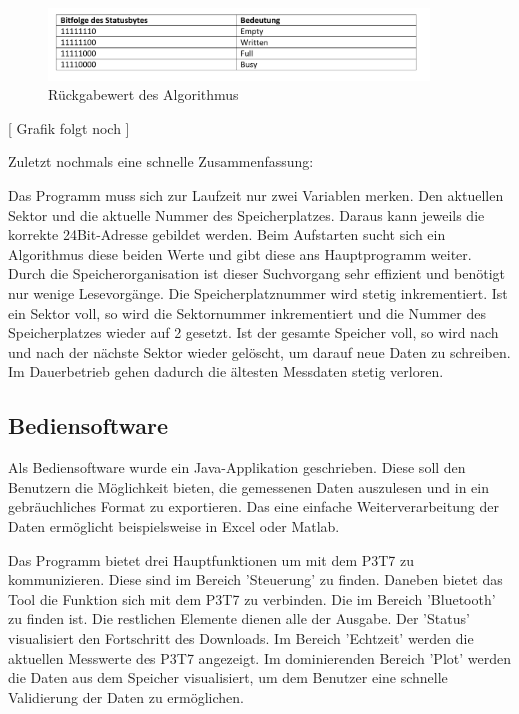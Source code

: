\begin{figure}[H]
\begin{center}
\includegraphics[width=0.9\textwidth]{images/Software_Tabelle_4.png}
\caption{Rückgabewert des Algorithmus}
\label{fig:Rückgabewert}
\end{center}
\end{figure}

[ Grafik folgt noch ] 

Zuletzt nochmals eine schnelle Zusammenfassung:

Das Programm muss sich zur Laufzeit nur zwei Variablen merken. Den aktuellen Sektor und die aktuelle Nummer des Speicherplatzes. Daraus kann jeweils die korrekte 24Bit-Adresse gebildet werden. Beim Aufstarten sucht sich ein Algorithmus diese beiden Werte und gibt diese ans Hauptprogramm weiter. Durch die Speicherorganisation ist dieser Suchvorgang sehr effizient und benötigt nur wenige Lesevorgänge. Die Speicherplatznummer wird stetig inkrementiert. Ist ein Sektor voll, so wird die Sektornummer inkrementiert und die Nummer des Speicherplatzes wieder auf 2 gesetzt. Ist der gesamte Speicher voll, so wird nach und nach der nächste Sektor wieder gelöscht, um darauf neue Daten zu schreiben. Im Dauerbetrieb gehen dadurch die ältesten Messdaten stetig verloren. 


\pagebreak
\subsection{Bediensoftware}%
Als Bediensoftware wurde ein Java-Applikation geschrieben. Diese soll den Benutzern die Möglichkeit bieten, die gemessenen Daten auszulesen und in ein gebräuchliches Format zu exportieren. Das eine einfache Weiterverarbeitung der Daten ermöglicht beispielsweise in Excel oder Matlab.

Das Programm bietet drei Hauptfunktionen um mit dem P3T7 zu kommunizieren. Diese sind im Bereich 'Steuerung' zu finden. Daneben bietet das Tool die Funktion sich mit dem P3T7 zu verbinden. Die im Bereich 'Bluetooth' zu finden ist. Die restlichen Elemente dienen alle der Ausgabe. Der 'Status' visualisiert den Fortschritt des Downloads. Im Bereich 'Echtzeit' werden die aktuellen Messwerte des P3T7 angezeigt. Im dominierenden Bereich 'Plot' werden die Daten aus dem Speicher visualisiert, um dem Benutzer eine schnelle Validierung der Daten zu ermöglichen.

